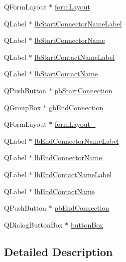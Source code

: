 \begin{DoxyCompactItemize}
\item 
Q\-Form\-Layout $\ast$ \hyperlink{class_ui__mdt_cl_article_link_dialog_a52541f497b55d3ca641067aaada9f2cf}{form\-Layout}
\item 
Q\-Label $\ast$ \hyperlink{class_ui__mdt_cl_article_link_dialog_adb9588f4cb287c75903043322fd0ddc3}{lb\-Start\-Connector\-Name\-Label}
\item 
Q\-Label $\ast$ \hyperlink{class_ui__mdt_cl_article_link_dialog_a7b96feb0c00fc3dcb432f022e0f64442}{lb\-Start\-Connector\-Name}
\item 
Q\-Label $\ast$ \hyperlink{class_ui__mdt_cl_article_link_dialog_a777f67de9fb9cdb8e8e862695f07eb3e}{lb\-Start\-Contact\-Name\-Label}
\item 
Q\-Label $\ast$ \hyperlink{class_ui__mdt_cl_article_link_dialog_a2f05b301e14e0b34f4b38d65c2822ab2}{lb\-Start\-Contact\-Name}
\item 
Q\-Push\-Button $\ast$ \hyperlink{class_ui__mdt_cl_article_link_dialog_aebe10d3a87978da5ba9595889e6df946}{pb\-Start\-Connection}
\item 
Q\-Group\-Box $\ast$ \hyperlink{class_ui__mdt_cl_article_link_dialog_a9190400abb240b93af9ceea759b9f8e8}{gb\-End\-Connection}
\item 
Q\-Form\-Layout $\ast$ \hyperlink{class_ui__mdt_cl_article_link_dialog_aa94c22d74e8881d63410b8769d0381c3}{form\-Layout\-\_}
\item 
Q\-Label $\ast$ \hyperlink{class_ui__mdt_cl_article_link_dialog_ac24c971234af2352ad8fdb31ff8300bc}{lb\-End\-Connector\-Name\-Label}
\item 
Q\-Label $\ast$ \hyperlink{class_ui__mdt_cl_article_link_dialog_a173b3c5ac4a1b46ed4ea209830ff0ba6}{lb\-End\-Connector\-Name}
\item 
Q\-Label $\ast$ \hyperlink{class_ui__mdt_cl_article_link_dialog_afe327a4f03402dcd26dd33ec7a45d625}{lb\-End\-Contact\-Name\-Label}
\item 
Q\-Label $\ast$ \hyperlink{class_ui__mdt_cl_article_link_dialog_aa0163584a3ecb7d5a8ddff9c480b2e8a}{lb\-End\-Contact\-Name}
\item 
Q\-Push\-Button $\ast$ \hyperlink{class_ui__mdt_cl_article_link_dialog_ad917ee21faf606b8de07a303cd35c595}{pb\-End\-Connection}
\item 
Q\-Dialog\-Button\-Box $\ast$ \hyperlink{class_ui__mdt_cl_article_link_dialog_a94e5a7edf091df56fba4eb32712223db}{button\-Box}
\end{DoxyCompactItemize}


\subsection{Detailed Description}


